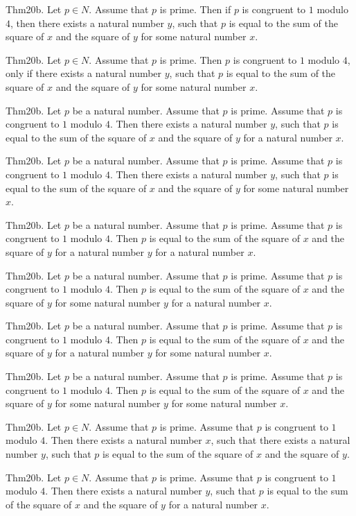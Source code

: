 \documentclass{article}
\begin{document}
Thm20b. Let $p \in N$. Assume that $p$ is prime. Then if $p$ is congruent to $1$ modulo $4$, then there exists a natural number $y$, such that $p$ is equal to the sum of the square of $x$ and the square of $y$ for some natural number $x$.

Thm20b. Let $p \in N$. Assume that $p$ is prime. Then $p$ is congruent to $1$ modulo $4$, only if there exists a natural number $y$, such that $p$ is equal to the sum of the square of $x$ and the square of $y$ for some natural number $x$.

Thm20b. Let $p$ be a natural number. Assume that $p$ is prime. Assume that $p$ is congruent to $1$ modulo $4$. Then there exists a natural number $y$, such that $p$ is equal to the sum of the square of $x$ and the square of $y$ for a natural number $x$.

Thm20b. Let $p$ be a natural number. Assume that $p$ is prime. Assume that $p$ is congruent to $1$ modulo $4$. Then there exists a natural number $y$, such that $p$ is equal to the sum of the square of $x$ and the square of $y$ for some natural number $x$.

Thm20b. Let $p$ be a natural number. Assume that $p$ is prime. Assume that $p$ is congruent to $1$ modulo $4$. Then $p$ is equal to the sum of the square of $x$ and the square of $y$ for a natural number $y$ for a natural number $x$.

Thm20b. Let $p$ be a natural number. Assume that $p$ is prime. Assume that $p$ is congruent to $1$ modulo $4$. Then $p$ is equal to the sum of the square of $x$ and the square of $y$ for some natural number $y$ for a natural number $x$.

Thm20b. Let $p$ be a natural number. Assume that $p$ is prime. Assume that $p$ is congruent to $1$ modulo $4$. Then $p$ is equal to the sum of the square of $x$ and the square of $y$ for a natural number $y$ for some natural number $x$.

Thm20b. Let $p$ be a natural number. Assume that $p$ is prime. Assume that $p$ is congruent to $1$ modulo $4$. Then $p$ is equal to the sum of the square of $x$ and the square of $y$ for some natural number $y$ for some natural number $x$.

Thm20b. Let $p \in N$. Assume that $p$ is prime. Assume that $p$ is congruent to $1$ modulo $4$. Then there exists a natural number $x$, such that there exists a natural number $y$, such that $p$ is equal to the sum of the square of $x$ and the square of $y$.

Thm20b. Let $p \in N$. Assume that $p$ is prime. Assume that $p$ is congruent to $1$ modulo $4$. Then there exists a natural number $y$, such that $p$ is equal to the sum of the square of $x$ and the square of $y$ for a natural number $x$.
\end{document}
